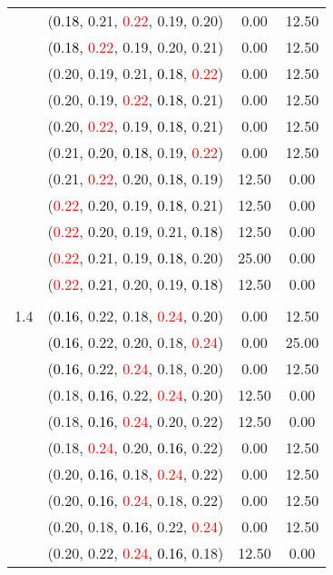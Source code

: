 \documentclass[10pt,a4paper]{report}
\begin{document}
\begin{center}
\begin{longtable}{clcc}
			&(\textcolor{black}{0.18}, 0.21, \textcolor{red}{0.22}, 0.19, 0.20)&0.00&12.50\\
			&(\textcolor{black}{0.18}, \textcolor{red}{0.22}, 0.19, 0.20, 0.21)&0.00&12.50\\
			&(0.20, 0.19, 0.21, \textcolor{black}{0.18}, \textcolor{red}{0.22})&0.00&12.50\\
			&(0.20, 0.19, \textcolor{red}{0.22}, \textcolor{black}{0.18}, 0.21)&0.00&12.50\\
			&(0.20, \textcolor{red}{0.22}, 0.19, \textcolor{black}{0.18}, 0.21)&0.00&12.50\\
			&(0.21, 0.20, \textcolor{black}{0.18}, 0.19, \textcolor{red}{0.22})&0.00&12.50\\
			&(0.21, \textcolor{red}{0.22}, 0.20, \textcolor{black}{0.18}, 0.19)&12.50&0.00\\
			&(\textcolor{red}{0.22}, 0.20, 0.19, \textcolor{black}{0.18}, 0.21)&12.50&0.00\\
			&(\textcolor{red}{0.22}, 0.20, 0.19, 0.21, \textcolor{black}{0.18})&12.50&0.00\\
			&(\textcolor{red}{0.22}, 0.21, 0.19, \textcolor{black}{0.18}, 0.20)&25.00&0.00\\
			&(\textcolor{red}{0.22}, 0.21, 0.20, 0.19, \textcolor{black}{0.18})&12.50&0.00\\
		&&&\\
		1.4			&(\textcolor{black}{0.16}, 0.22, 0.18, \textcolor{red}{0.24}, 0.20)&0.00&12.50\\
			&(\textcolor{black}{0.16}, 0.22, 0.20, 0.18, \textcolor{red}{0.24})&0.00&25.00\\
			&(\textcolor{black}{0.16}, 0.22, \textcolor{red}{0.24}, 0.18, 0.20)&0.00&12.50\\
			&(0.18, \textcolor{black}{0.16}, 0.22, \textcolor{red}{0.24}, 0.20)&12.50&0.00\\
			&(0.18, \textcolor{black}{0.16}, \textcolor{red}{0.24}, 0.20, 0.22)&12.50&0.00\\
			&(0.18, \textcolor{red}{0.24}, 0.20, \textcolor{black}{0.16}, 0.22)&0.00&12.50\\
			&(0.20, \textcolor{black}{0.16}, 0.18, \textcolor{red}{0.24}, 0.22)&0.00&12.50\\
			&(0.20, \textcolor{black}{0.16}, \textcolor{red}{0.24}, 0.18, 0.22)&0.00&12.50\\
			&(0.20, 0.18, \textcolor{black}{0.16}, 0.22, \textcolor{red}{0.24})&0.00&12.50\\
			&(0.20, 0.22, \textcolor{red}{0.24}, \textcolor{black}{0.16}, 0.18)&12.50&0.00\\

\end{longtable}
\end{center}
\end{document}
